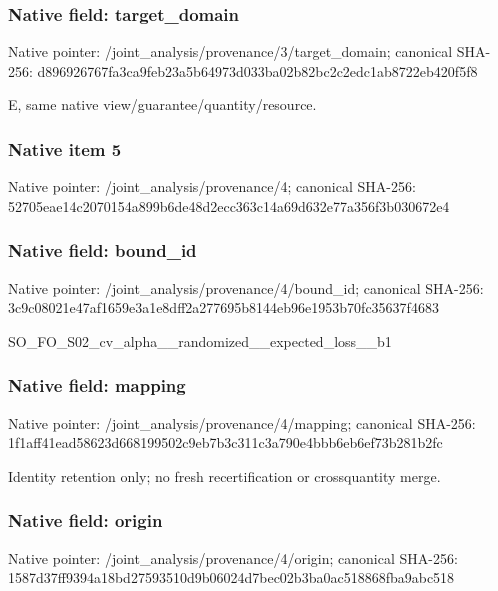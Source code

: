 \documentclass[10pt,a4paper]{article}
\begin{document}
\subsubsection{Native field: target\_domain}


Native pointer: /joint\_analysis/provenan\allowbreak{}ce/3/target\_domain; canonical SHA-256: d896926767fa3ca9feb23a5b\allowbreak{}64973d033ba02b82bc2c2edc\allowbreak{}1ab8722eb420f5f8


E, same native view/guarantee/quantity/resource.


\subsubsection{Native item 5}


Native pointer: /joint\_analysis/provenance/4; canonical SHA-256: 52705eae14c2070154a899b6\allowbreak{}de48d2ecc363c14a69d632e7\allowbreak{}7a356f3b030672e4



\subsubsection{Native field: bound\_id}


Native pointer: /joint\_analysis/provenance/4/bound\_id; canonical SHA-256: 3c9c08021e47af1659e3a1e8\allowbreak{}dff2a277695b8144eb96e195\allowbreak{}3b70fc35637f4683


SO\_FO\_S02\_cv\_alpha\_\_rand\allowbreak{}omized\_\_expected\_loss\_\_b\allowbreak{}1


\subsubsection{Native field: mapping}


Native pointer: /joint\_analysis/provenance/4/mapping; canonical SHA-256: 1f1aff41ead58623d6681995\allowbreak{}02c9eb7b3c311c3a790e4bbb\allowbreak{}6eb6ef73b281b2fc


Identity retention only; no fresh recertification or crossquantity merge.


\subsubsection{Native field: origin}


Native pointer: /joint\_analysis/provenance/4/origin; canonical SHA-256: 1587d37ff9394a18bd275935\allowbreak{}10d9b06024d7bec02b3ba0ac\allowbreak{}518868fba9abc518
\end{document}
